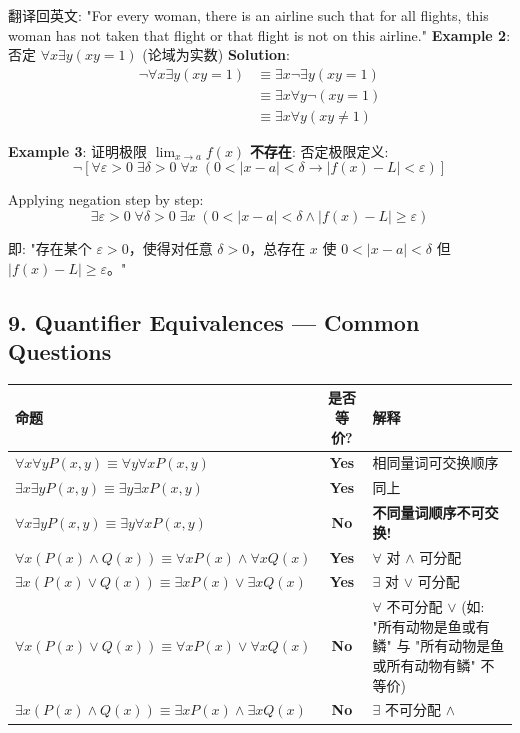 \documentclass[10pt,a4paper,openany]{ctexbook}
\theoremstyle{definition}
\theoremstyle{remark}
\begin{document}
翻译回英文: "For every woman, there is an airline such that for all flights, this woman has not taken that flight or that flight is not on this airline."
\textbf{Example 2}: 否定 $\forall x \exists y (xy = 1)$ (论域为实数)
\textbf{Solution}:
\[
\begin{aligned}
\neg \forall x \exists y (xy = 1) &\equiv \exists x \neg \exists y (xy = 1) \\
&\equiv \exists x \forall y \neg (xy = 1) \\
&\equiv \exists x \forall y (xy \neq 1)
\end{aligned}
\]

\textbf{Example 3}: 证明极限 $\lim_{x \to a} f(x)$ \textbf{不存在}:
否定极限定义:
\[
\neg [\forall \varepsilon > 0 \; \exists \delta > 0 \; \forall x \; (0 < |x - a| < \delta \to |f(x) - L| < \varepsilon)]
\]

Applying negation step by step:
\[
\exists \varepsilon > 0 \; \forall \delta > 0 \; \exists x \; (0 < |x - a| < \delta \land |f(x) - L| \geq \varepsilon)
\]

即: "存在某个 $\varepsilon > 0$，使得对任意 $\delta > 0$，总存在 $x$ 使 $0 < |x-a| < \delta$ 但 $|f(x)-L| \geq \varepsilon$。"
\vspace{-2pt}

\subsection{9. Quantifier Equivalences — Common Questions}

\begin{center}
\begin{tabular}{lcl}
\hline
命题 & 是否等价? & 解释 \\ \hline
$\forall x \forall y P(x,y) \equiv \forall y \forall x P(x,y)$ & \textbf{Yes} & 相同量词可交换顺序 \\
$\exists x \exists y P(x,y) \equiv \exists y \exists x P(x,y)$ & \textbf{Yes} & 同上 \\
$\forall x \exists y P(x,y) \equiv \exists y \forall x P(x,y)$ & \textbf{No} & \textbf{不同量词顺序不可交换!} \\
$\forall x (P(x) \land Q(x)) \equiv \forall x P(x) \land \forall x Q(x)$ & \textbf{Yes} & $\forall$ 对 $\land$ 可分配 \\
$\exists x (P(x) \lor Q(x)) \equiv \exists x P(x) \lor \exists x Q(x)$ & \textbf{Yes} & $\exists$ 对 $\lor$ 可分配 \\
$\forall x (P(x) \lor Q(x)) \equiv \forall x P(x) \lor \forall x Q(x)$ & \textbf{No} & $\forall$ 不可分配 $\lor$ (如: "所有动物是鱼或有鳞" 与 "所有动物是鱼或所有动物有鳞" 不等价) \\
$\exists x (P(x) \land Q(x)) \equiv \exists x P(x) \land \exists x Q(x)$ & \textbf{No} & $\exists$ 不可分配 $\land$ \\
\hline
\end{tabular}

\end{center}
\end{document}
